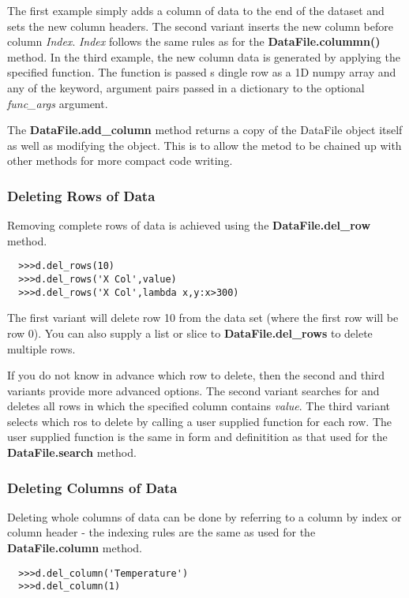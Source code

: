 \documentclass[a4paper,11pt]{scrartcl}
\begin{document}
The first example simply adds a column of data to the end of the dataset and sets the new column headers. The second variant  inserts the new column before column \textit{Index}. \textit{Index} follows the same rules as for the \textbf{DataFile.colummn()} method. In the third example, the new column data is generated by applying the specified function. The function is passed s dingle row as a 1D numpy array and any of the keyword, argument pairs passed in a dictionary to the optional \textit{func\_args} argument.

The \textbf{DataFile.add\_column} method returns a copy of the DataFile object itself as well as modifying the object. This is to allow the metod to be chained up with other methods for more compact code writing.

\subsubsection{Deleting Rows of Data}

Removing complete rows of data is achieved using the \textbf{DataFile.del\_row} method.

\begin{verbatim}
  >>>d.del_rows(10)
  >>>d.del_rows('X Col',value)
  >>>d.del_rows('X Col',lambda x,y:x>300)
\end{verbatim}

The first variant will delete row 10 from the data set (where the first row will be row 0). You can also supply a list or slice to \textbf{DataFile.del\_rows} to delete multiple rows.

If you do not know in advance which row to delete, then the second and third variants provide more advanced options. The second variant searches for and deletes all rows in which the specified column contains \textit{value}. The third variant selects which ros to delete by calling a user supplied function for each row. The user supplied function is the same in form and definitition as that used for the \textbf{DataFile.search} method.

\subsubsection{Deleting Columns of Data}

Deleting whole columns of data can be done by referring to a column by index or column header - the indexing rules are the same as used for the \textbf{DataFile.column} method.

\begin{verbatim}
  >>>d.del_column('Temperature')
  >>>d.del_column(1)
\end{verbatim}
\end{document}
